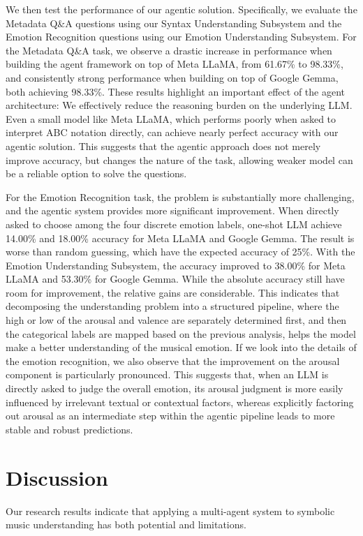 \documentclass[sigconf]{acmart}
\begin{document}
We then test the performance of our agentic solution. Specifically, we evaluate the Metadata Q\&A questions using our Syntax Understanding Subsystem and the Emotion Recognition questions using our Emotion Understanding Subsystem. For the Metadata Q\&A task, we observe a drastic increase in performance when building the agent framework on top of Meta LLaMA, from 61.67\% to 98.33\%, and consistently strong performance when building on top of Google Gemma, both achieving 98.33\%. These results highlight an important effect of the agent architecture: We effectively reduce the reasoning burden on the underlying LLM. Even a small model like Meta LLaMA, which performs poorly when asked to interpret ABC notation directly, can achieve nearly perfect accuracy with our agentic solution. This suggests that the agentic approach does not merely improve accuracy, but  changes the nature of the task, allowing weaker model can be a reliable option to solve the questions.

For the Emotion Recognition task, the problem is substantially more challenging, and the agentic system provides more significant improvement. When directly asked to choose among the four discrete emotion labels, one-shot LLM achieve 14.00\% and 18.00\% accuracy for Meta LLaMA and Google Gemma. The result is worse than random guessing, which have the expected accuracy of 25\%. With the Emotion Understanding Subsystem, the accuracy improved to 38.00\% for Meta LLaMA and 53.30\% for Google Gemma. While the absolute accuracy still have room for improvement, the relative gains are considerable. This indicates that decomposing the understanding problem into a structured pipeline, where the high or low of the arousal and valence are separately determined first, and then the categorical labels are mapped based on the previous analysis, helps the model make a better understanding of the musical emotion. If we look into the details of the emotion recognition, we also observe that the improvement on the arousal component is particularly pronounced. This suggests that, when an LLM is directly asked to judge the overall emotion, its arousal judgment is more easily influenced by irrelevant textual or contextual factors, whereas explicitly factoring out arousal as an intermediate step within the agentic pipeline leads to more stable and robust predictions.

\section{Discussion}
Our research results indicate that applying a multi-agent system to symbolic music understanding has both potential and limitations. 
\end{document}
